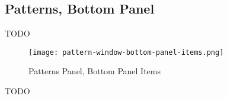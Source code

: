 \subsection{Patterns, Bottom Panel}
\label{subsec:seq24_patterns_panel_bottom}

   TODO

\begin{figure}[H]
   \centering 
   \texttt{[image: pattern-window-bottom-panel-items.png]}
   \caption{Patterns Panel, Bottom Panel Items}
   \label{fig:pattern_window_bottom_panel_items}
\end{figure}

   TODO


